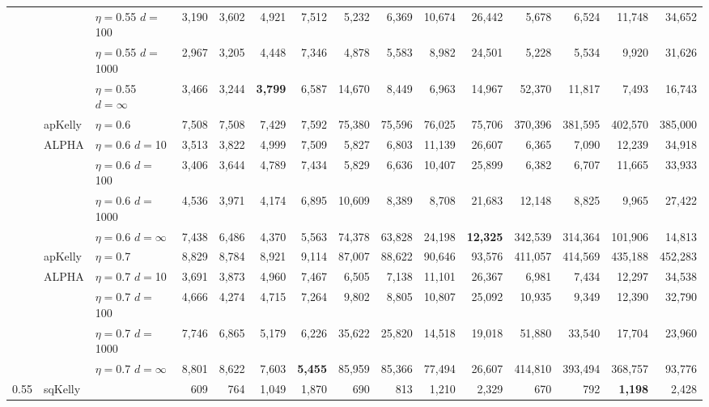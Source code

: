 \documentclass[aoas]{imsart}
\begin{document}
\begin{table}
\begin{tabular}{lll|rrrr|rrrr|rrrr}
&  & $\eta=$0.55 $d=$100 & 3,190  & 3,602  & 4,921  & 7,512  & 5,232  & 6,369  & 10,674  & 26,442  & 5,678  & 6,524  & 11,748  & 34,652  \\
&  & $\eta=$0.55 $d=$1000 & 2,967  & 3,205  & 4,448  & 7,346  & 4,878  & 5,583  & 8,982  & 24,501  & 5,228  & 5,534  & 9,920  & 31,626  \\
 &  & $\eta=$0.55 $d=\infty$ & 3,466  & 3,244  & \bf{3,799}  & 6,587  & 14,670  & 8,449  & 6,963  & 14,967  & 52,370  & 11,817  & 7,493  & 16,743  \\
\cline{2-15} & apKelly & $\eta=$0.6 & 7,508  & 7,508  & 7,429  & 7,592  & 75,380  & 75,596  & 76,025  & 75,706  & 370,396  & 381,595  & 402,570  & 385,000  \\
\cline{2-15}
& ALPHA & $\eta=$0.6 $d=$10 & 3,513  & 3,822  & 4,999  & 7,509  & 5,827  & 6,803  & 11,139  & 26,607  & 6,365  & 7,090  & 12,239  & 34,918  \\
&  & $\eta=$0.6 $d=$100 & 3,406  & 3,644  & 4,789  & 7,434  & 5,829  & 6,636  & 10,407  & 25,899  & 6,382  & 6,707  & 11,665  & 33,933  \\
&  & $\eta=$0.6 $d=$1000 & 4,536  & 3,971  & 4,174  & 6,895  & 10,609  & 8,389  & 8,708  & 21,683  & 12,148  & 8,825  & 9,965  & 27,422  \\
 &  & $\eta=$0.6 $d=\infty$ & 7,438  & 6,486  & 4,370  & 5,563  & 74,378  & 63,828  & 24,198  & \bf{12,325}  & 342,539  & 314,364  & 101,906  & 14,813  \\
\cline{2-15} & apKelly & $\eta=$0.7 & 8,829  & 8,784  & 8,921  & 9,114  & 87,007  & 88,622  & 90,646  & 93,576  & 411,057  & 414,569  & 435,188  & 452,283  \\
\cline{2-15}
& ALPHA & $\eta=$0.7 $d=$10 & 3,691  & 3,873  & 4,960  & 7,467  & 6,505  & 7,138  & 11,101  & 26,367  & 6,981  & 7,434  & 12,297  & 34,538  \\
&  & $\eta=$0.7 $d=$100 & 4,666  & 4,274  & 4,715  & 7,264  & 9,802  & 8,805  & 10,807  & 25,092  & 10,935  & 9,349  & 12,390  & 32,790  \\
&  & $\eta=$0.7 $d=$1000 & 7,746  & 6,865  & 5,179  & 6,226  & 35,622  & 25,820  & 14,518  & 19,018  & 51,880  & 33,540  & 17,704  & 23,960  \\
 &  & $\eta=$0.7 $d=\infty$ & 8,801  & 8,622  & 7,603  & \bf{5,455}  & 85,959  & 85,366  & 77,494  & 26,607  & 414,810  & 393,494  & 368,757  & 93,776  \\
\hline 0.55 & sqKelly & & 609  & 764  & 1,049  & 1,870  & 690  & 813  & 1,210  & 2,329  & 670  & 792  & \bf{1,198}  & 2,428  \\

\end{tabular}
\end{table}
\end{document}
